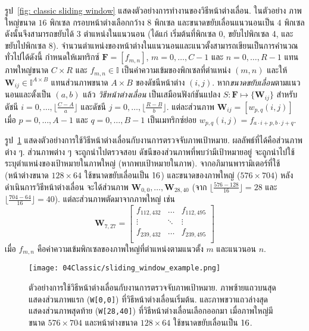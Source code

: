 รูป~\ref{fig: classic sliding window}
แสดงตัวอย่างการทำงานของวิธีหน้าต่างเลื่อน.
ในตัวอย่าง ภาพใหญ่ขนาด $16$ พิกเซล
กรอบหน้าต่างเลือกกว้าง $8$ พิกเซล และขนาดขยับเลื่อนแนวนอนเป็น $4$ พิกเซล
ดังนั้นจึงสามารถขยับได้ $3$ ตำแหน่งในแนวนอน (ได้แก่ เริ่มต้นที่พิกเซล 0, ขยับไปพิกเซล 4, และขยับไปพิกเซล 8).
จำนวนตำแหน่งของหน้าต่างในแนวนอนและแนวตั้งสามารถเขียนเป็นการคำนวณทั่วไปได้ดังนี้
กำหนดให้เมทริกซ์ 
$\bm{F} = [f_{m,n}]$, $m = 0, \ldots, C-1$ และ $n = 0, \ldots, R-1$
แทนภาพใหญ่ขนาด $C \times R$
และ $f_{m,n} \in \mathbb{I}$ เป็นค่าความเข้มของพิกเซลที่ตำแหน่ง $(m,n)$
และให้ $\bm{W}_{ij} \in \mathbb{I}^{A \times B}$ แทนส่วนภาพขนาด $A \times B$ ของดัชนีหน้าต่าง $(i,j)$.
หาก\textit{ขนาดขยับเลื่อน}ตามแนวนอนและตั้งเป็น $(a,b)$ แล้ว 
\textit{วิธีหน้าต่างเลื่อน} เป็นเสมือนฟังก์ชันแปลง $S: \bm{F} \mapsto \{ \bm{W}_{ij} \}$ %
สำหรับดัชนี $i = 0, \ldots, \lfloor \frac{C - A}{a} \rfloor$ 
และดัชนี $j = 0, \ldots, \lfloor \frac{R - B}{b} \rfloor$.
แต่ละส่วนภาพ $\bm{W}_{ij} = [w_{p,q}(i,j)]$
เมื่อ $p = 0, \ldots, A-1$ และ $q = 0, \ldots, B-1$
เป็นเมทริกซ์ย่อย
$w_{p,q}(i,j) = f_{a \cdot i + p, b \cdot j + q}$.

รูป~\ref{fig: classic sliding window on object detection}
แสดงตัวอย่างการใช้วิธีหน้าต่างเลื่อนกับงานการตรวจจับภาพเป้าหมาย.
ผลลัพธ์ที่ได้คือส่วนภาพต่าง ๆ.
ส่วนภาพต่าง ๆ จะถูกนำไปตรวจสอบ
ดัชนีของส่วนภาพที่พบว่ามีเป้าหมายอยู่ จะถูกนำไปใช้ระบุตำแหน่งของเป้าหมายในภาพใหญ่ (หากพบเป้าหมายในภาพ).
จากอภิมานพารามิเตอร์ที่ใช้ (หน้าต่างขนาด $128 \times 64$ ใช้ขนาดขยับเลื่อนเป็น $16 \time 16$)
และขนาดของภาพใหญ่ ($576 \times 704$)
หลังดำเนินการวิธีหน้าต่างเลื่อน จะได้ส่วนภาพ $\bm{W}_{0,0}, \ldots, \bm{W}_{28, 40}$ (จาก $\lfloor \frac{576 - 128}{16} \rfloor = 28$ และ $\lfloor \frac{704 - 64}{16} \rfloor = 40$).
แต่ละส่วนภาพตัดมาจากภาพใหญ่ เช่น 
\[
\bm{W}_{7,27} = 
\begin{bmatrix}
f_{112,432} & \ldots & f_{112,495} \\
\vdots & \ddots & \vdots \\
f_{239,432} & \ldots & f_{239,495} \\
\end{bmatrix}
\]
เมื่อ $f_{m,n}$ คือค่าความเข้มพิกเซลของภาพใหญ่ที่ตำแหน่งตามแนวตั้ง $m$ และแนวนอน $n$.

%
\begin{figure}
	\begin{center}
		\texttt{[image: 04Classic/sliding\_window\_example.png]}
		\caption[วิธีหน้าต่างเลื่อนกับการตรวจจับภาพเป้าหมาย]{ตัวอย่างการใช้วิธีหน้าต่างเลื่อนกับงานการตรวจจับภาพเป้าหมาย.
			ภาพซ้ายแถวบนสุด แสดงส่วนภาพแรก (\texttt{W[0,0]}) ที่วิธีหน้าต่างเลื่อนเริ่มต้น.
			และภาพขวาแถวล่างสุด แสดงส่วนภาพสุดท้าย (\texttt{W[28,40]}) ที่วิธีหน้าต่างเลื่อนเลือกออกมา
			เมื่อภาพใหญ่มีขนาด $576 \times 704$ และหน้าต่างขนาด $128 \times 64$ ใช้ขนาดขยับเลื่อนเป็น $16 \time 16$.
		}
		\label{fig: classic sliding window on object detection}
	\end{center}
\end{figure}
%



